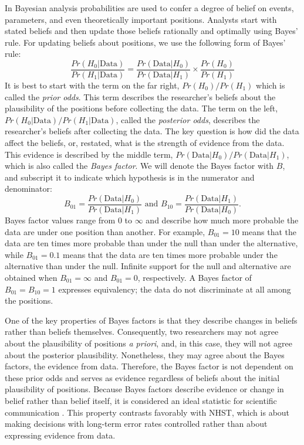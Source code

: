 \documentclass[man]{apa6}
\begin{document}
In Bayesian analysis probabilities are used to confer a degree of belief on events, parameters, and even theoretically important positions.  Analysts start with stated beliefs and then update those beliefs rationally and optimally using Bayes' rule.  For updating beliefs about positions, we use the following form of Bayes' rule:
\begin{equation}
\frac{Pr(H_0 | \mbox{Data})}{Pr(H_1 | \mbox{Data})} = \frac{Pr(\mbox{Data} | H_0)}{Pr(\mbox{Data} | H_1)} \times \frac{Pr(H_0)}{Pr (H_1)} 
\end{equation}
It is best to start with the term on the far right, $Pr(H_0)/Pr(H_1)$ which is called the {\em prior odds}.  This term describes the researcher's beliefs about the plausibility of the positions before collecting the data.  The term on the left, $Pr(H_0 | \mbox{Data})/Pr(H_1 | \mbox{Data})$, called the {\em posterior odds}, describes the researcher's beliefs after collecting the data.   The key question is how did the data affect the beliefs, or, restated, what is the strength of evidence from the data.  This evidence is described by the middle term,  $Pr(\mbox{Data} | H_0)/Pr(\mbox{Data} | H_1)$, which is also called the {\em Bayes factor}.  We will denote the Bayes factor with $B$, and subscript it to indicate which hypothesis is in the numerator and denominator:
\[
B_{01} = \frac{Pr(\mbox{Data} | H_0)}{Pr(\mbox{Data} | H_1)} \mbox{ and } B_{10} = \frac{Pr(\mbox{Data} | H_1)}{Pr(\mbox{Data} | H_0)}.
\]
Bayes factor values range from 0 to $\infty$ and describe how much more probable the data are under one position than another.  For example, $B_{01}=10$ means that the data are ten times more probable than under the null than under the alternative, while $B_{01}=0.1$ means that the data are ten times more probable under the alternative than under the null.  Infinite support for the null and alternative are obtained when $B_{01}=\infty$ and $B_{01}=0$, respectively.  A Bayes factor of $B_{01}=B_{10}=1$ expresses equivalency; the data do not discriminate at all among the positions.

One of the key properties of Bayes factors is that they describe changes in beliefs rather than beliefs themselves.  Consequently, two researchers may not agree about the plausibility of positions {\em a priori}, and, in this case, they will not agree about the posterior plausibility.  Nonetheless, they may agree about the Bayes factors, the evidence from data.  Therefore, the Bayes factor is not dependent on these prior odds and serves as evidence regardless of beliefs about the initial plausibility of positions.  Because Bayes factors describe evidence or change in belief rather than belief itself, it is considered an ideal statistic for scientific communication \citep{Jeffreys:1961}.  This property contrasts favorably with NHST, which is about making decisions with long-term error rates controlled rather than about expressing evidence from data. 
\end{document}
